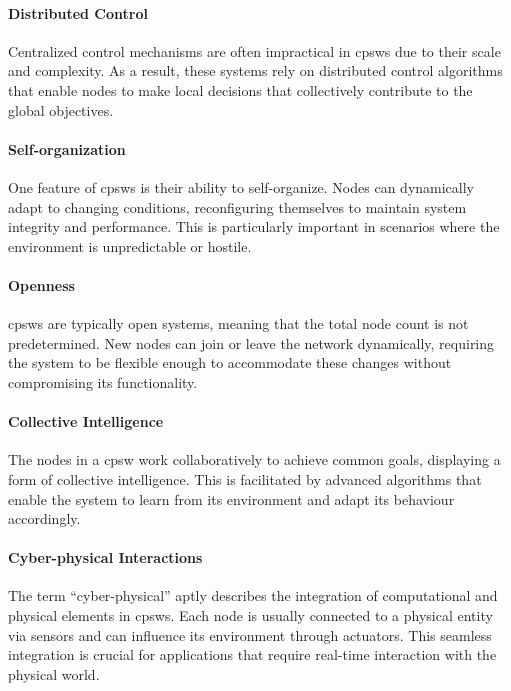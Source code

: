 \paragraph*{Distributed Control}
Centralized control mechanisms are often impractical in \acp{cpsw} due to their scale and complexity. 
 As a result, these systems rely on distributed control algorithms that enable nodes to make local decisions that collectively contribute to the global objectives.

\paragraph*{Self-organization}
One feature of \acp{cpsw} is their ability to self-organize. 
Nodes can dynamically adapt to changing conditions, reconfiguring themselves to maintain system integrity and performance. 
This is particularly important in scenarios where the environment is unpredictable or hostile.

\paragraph*{Openness}
\acp{cpsw} are typically open systems, meaning that the total node count is not predetermined. 
New nodes can join or leave the network dynamically, requiring the system to be flexible enough to accommodate these changes without compromising its functionality.

\paragraph*{Collective Intelligence}
The nodes in a \ac{cpsw} work collaboratively to achieve common goals, displaying a form of collective intelligence. 
This is facilitated by advanced algorithms that enable the system to learn from its environment and adapt its behaviour accordingly.

\paragraph*{Cyber-physical Interactions}
The term ``cyber-physical'' aptly describes the integration of computational and physical elements in \acp{cpsw}. 
 Each node is usually connected to a physical entity via sensors and can influence its environment through actuators. 
 This seamless integration is crucial for applications that require real-time interaction with the physical world.

